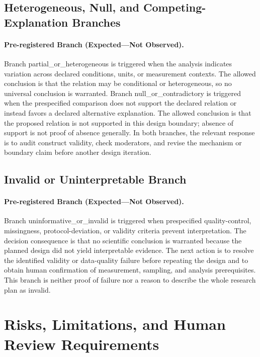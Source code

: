 \documentclass[conference]{IEEEtran}
\begin{document}
\subsection{Heterogeneous, Null, and Competing-Explanation Branches}
\paragraph{Pre-registered Branch (Expected---Not Observed).} Branch partial\_or\_heterogeneous is triggered when the analysis indicates variation across declared conditions, units, or measurement contexts. The allowed conclusion is that the relation may be conditional or heterogeneous, so no universal conclusion is warranted. Branch null\_or\_contradictory is triggered when the prespecified comparison does not support the declared relation or instead favors a declared alternative explanation. The allowed conclusion is that the proposed relation is not supported in this design boundary; absence of support is not proof of absence generally. In both branches, the relevant response is to audit construct validity, check moderators, and revise the mechanism or boundary claim before another design iteration.

\subsection{Invalid or Uninterpretable Branch}
\paragraph{Pre-registered Branch (Expected---Not Observed).} Branch uninformative\_or\_invalid is triggered when prespecified quality-control, missingness, protocol-deviation, or validity criteria prevent interpretation. The decision consequence is that no scientific conclusion is warranted because the planned design did not yield interpretable evidence. The next action is to resolve the identified validity or data-quality failure before repeating the design and to obtain human confirmation of measurement, sampling, and analysis prerequisites. This branch is neither proof of failure nor a reason to describe the whole research plan as invalid.

\section{Risks, Limitations, and Human Review Requirements}
\end{document}
